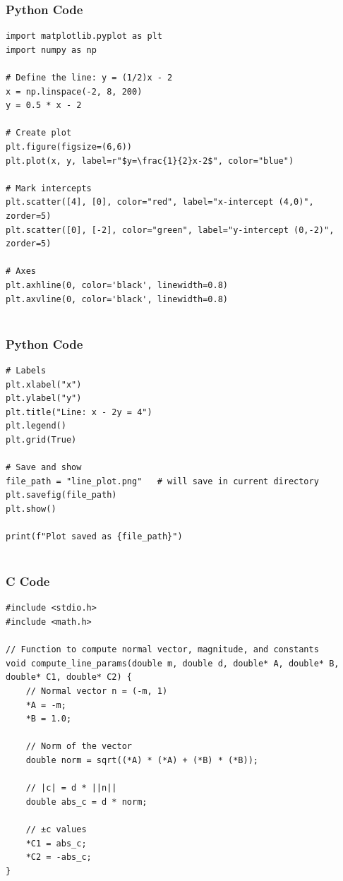 \documentclass{beamer}
\begin{document}
\begin{frame}[fragile]
    \frametitle{Python Code}

    \begin{lstlisting}
import matplotlib.pyplot as plt
import numpy as np

# Define the line: y = (1/2)x - 2
x = np.linspace(-2, 8, 200)
y = 0.5 * x - 2

# Create plot
plt.figure(figsize=(6,6))
plt.plot(x, y, label=r"$y=\frac{1}{2}x-2$", color="blue")

# Mark intercepts
plt.scatter([4], [0], color="red", label="x-intercept (4,0)", zorder=5)
plt.scatter([0], [-2], color="green", label="y-intercept (0,-2)", zorder=5)

# Axes
plt.axhline(0, color='black', linewidth=0.8)
plt.axvline(0, color='black', linewidth=0.8)


  \end{lstlisting}
\end{frame}
\begin{frame}[fragile]
    \frametitle{Python Code}

    \begin{lstlisting}
# Labels
plt.xlabel("x")
plt.ylabel("y")
plt.title("Line: x - 2y = 4")
plt.legend()
plt.grid(True)

# Save and show
file_path = "line_plot.png"   # will save in current directory
plt.savefig(file_path)
plt.show()

print(f"Plot saved as {file_path}")


  \end{lstlisting}
\end{frame}
\begin{frame}[fragile]
\frametitle{C Code}
\begin{lstlisting}
#include <stdio.h>
#include <math.h>

// Function to compute normal vector, magnitude, and constants
void compute_line_params(double m, double d, double* A, double* B, double* C1, double* C2) {
    // Normal vector n = (-m, 1)
    *A = -m;
    *B = 1.0;

    // Norm of the vector
    double norm = sqrt((*A) * (*A) + (*B) * (*B));

    // |c| = d * ||n||
    double abs_c = d * norm;

    // ±c values
    *C1 = abs_c;
    *C2 = -abs_c;
}

    \end{lstlisting}

\end{frame}
\end{document}
